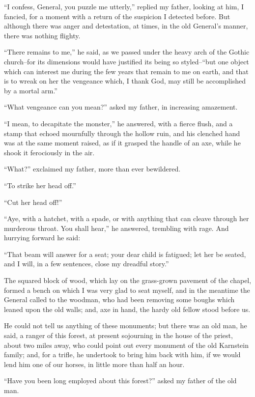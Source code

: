 \documentclass[11pt,twoside,makeidx,hidelinks,]{memoir}
\begin{document}
``I confess, General, you puzzle me utterly,'' replied my father, looking
at him, I fancied, for a moment with a return of the suspicion I
detected before. But although there was anger and detestation, at times,
in the old General's manner, there was nothing flighty.

``There remains to me,'' he said, as we passed under the heavy arch of
the Gothic church--for its dimensions would have justified its being so
styled--``but one object which can interest me during the few years that
remain to me on earth, and that is to wreak on her the vengeance which,
I thank God, may still be accomplished by a mortal arm.''

``What vengeance can you mean?'' asked my father, in increasing amazement.

``I mean, to decapitate the monster,'' he answered, with a fierce flush,
and a stamp that echoed mournfully through the hollow ruin, and his
clenched hand was at the same moment raised, as if it grasped the handle
of an axe, while he shook it ferociously in the air.

``What?'' exclaimed my father, more than ever bewildered.

``To strike her head off.''

``Cut her head off!''

``Aye, with a hatchet, with a spade, or with anything that can cleave
through her murderous throat. You shall hear,'' he answered, trembling
with rage. And hurrying forward he said:

``That beam will answer for a seat; your dear child is fatigued; let her
be seated, and I will, in a few sentences, close my dreadful story.''

The squared block of wood, which lay on the grass-grown pavement of the
chapel, formed a bench on which I was very glad to seat myself, and in
the meantime the General called to the woodman, who had been removing
some boughs which leaned upon the old walls; and, axe in hand, the hardy
old fellow stood before us.

He could not tell us anything of these monuments; but there was an old
man, he said, a ranger of this forest, at present sojourning in the
house of the priest, about two miles away, who could point out every
monument of the old Karnstein family; and, for a trifle, he undertook
to bring him back with him, if we would lend him one of our horses, in
little more than half an hour.

``Have you been long employed about this forest?'' asked my father of the
old man.
\end{document}
